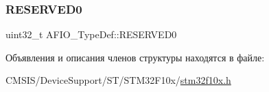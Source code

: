 \subsubsection{\texorpdfstring{RESERVED0}{RESERVED0}}
{\footnotesize\ttfamily uint32\+\_\+t A\+F\+I\+O\+\_\+\+Type\+Def\+::\+R\+E\+S\+E\+R\+V\+E\+D0}



Объявления и описания членов структуры находятся в файле\+:\begin{DoxyCompactItemize}
\item 
C\+M\+S\+I\+S/\+Device\+Support/\+S\+T/\+S\+T\+M32\+F10x/\mbox{\hyperlink{stm32f10x_8h}{stm32f10x.\+h}}\end{DoxyCompactItemize}
